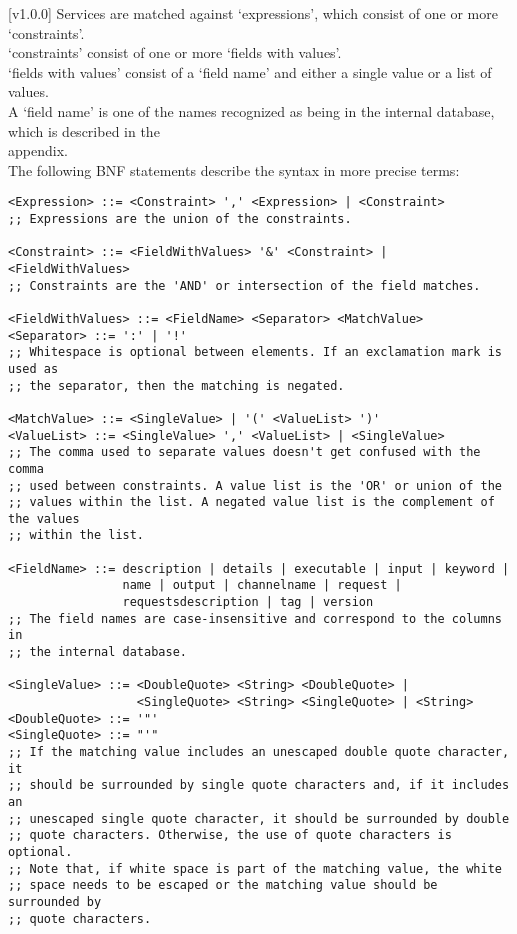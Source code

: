 [v1.0.0]
%
Services are matched against `expressions', which consist of one or more
`constraints'.\\
`constraints' consist of one or more `fields with values'.\\
`fields with values' consist of a `field name' and either a single value or a list of
values.\\
A `field name' is one of the names recognized as being in the internal database, which is
described in the\\
 appendix.\\

The following BNF statements describe the syntax in more precise terms:
\outputBegin{}
\begin{verbatim}
<Expression> ::= <Constraint> ',' <Expression> | <Constraint>
;; Expressions are the union of the constraints.

<Constraint> ::= <FieldWithValues> '&' <Constraint> | <FieldWithValues>
;; Constraints are the 'AND' or intersection of the field matches.

<FieldWithValues> ::= <FieldName> <Separator> <MatchValue>
<Separator> ::= ':' | '!'
;; Whitespace is optional between elements. If an exclamation mark is used as
;; the separator, then the matching is negated.

<MatchValue> ::= <SingleValue> | '(' <ValueList> ')'
<ValueList> ::= <SingleValue> ',' <ValueList> | <SingleValue>
;; The comma used to separate values doesn't get confused with the comma
;; used between constraints. A value list is the 'OR' or union of the
;; values within the list. A negated value list is the complement of the values
;; within the list.

<FieldName> ::= description | details | executable | input | keyword |
                name | output | channelname | request |
                requestsdescription | tag | version
;; The field names are case-insensitive and correspond to the columns in
;; the internal database.

<SingleValue> ::= <DoubleQuote> <String> <DoubleQuote> |
                  <SingleQuote> <String> <SingleQuote> | <String>
<DoubleQuote> ::= '"'
<SingleQuote> ::= "'"
;; If the matching value includes an unescaped double quote character, it
;; should be surrounded by single quote characters and, if it includes an
;; unescaped single quote character, it should be surrounded by double
;; quote characters. Otherwise, the use of quote characters is optional.
;; Note that, if white space is part of the matching value, the white
;; space needs to be escaped or the matching value should be surrounded by
;; quote characters.
\end{verbatim}

